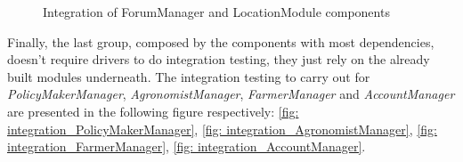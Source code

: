 \documentclass[table, 12pt]{article}
\begin{document}
\begin{figure}[H]
    \centering
    \qquad\qquad
    \caption{Integration of ForumManager and LocationModule components}%
    \label{fig: integration_ForumManager_LocationModule}%
\end{figure}

Finally, the last group, composed by the components with most dependencies, doesn't require drivers to do integration testing, they just rely on the already built modules underneath. The integration testing to carry out for \emph{PolicyMakerManager}, \emph{AgronomistManager}, \emph{FarmerManager} and \emph{AccountManager} are presented in the following figure respectively: \ref{fig: integration_PolicyMakerManager}, \ref{fig: integration_AgronomistManager}, \ref{fig: integration_FarmerManager}, \ref{fig: integration_AccountManager}.
\end{document}
